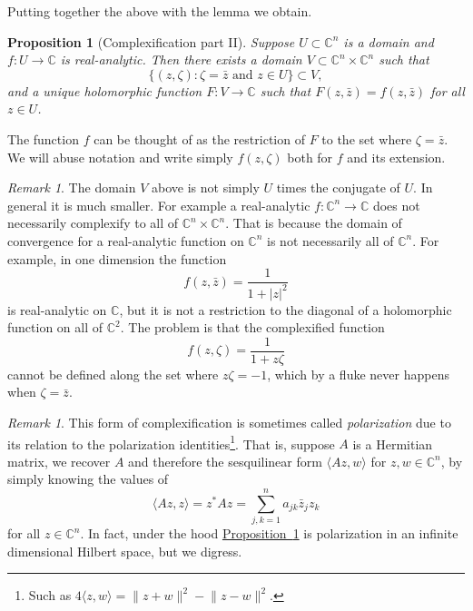 \documentclass[12pt,openany]{book}
\newcommand{\linnprod}[2]{\langle #1 , #2 \rangle}
\newcommand{\sabs}[1]{\lvert {#1} \rvert}
\newcommand{\snorm}[1]{\lVert {#1} \rVert}
\newcommand{\C}{{\mathbb{C}}}
\newcommand{\myindex}[1]{#1\index{#1}}
\theoremstyle{plain}
\newtheorem{prop}[thm]{Proposition}
\theoremstyle{remark}
\newtheorem{remark}[thm]{Remark}
\theoremstyle{definition}
\theoremstyle{exercise}
\theoremstyle{example}
\newcommand{\propref}[1]{\hyperref[#1]{Proposition~\ref*{#1}}}
\begin{document}
Putting together the above with the lemma we obtain.

\begin{prop}[Complexification part II] \label{prop:complexificationpt2}
Suppose $U \subset \C^n$ is a domain and $f \colon U \to \C$ is
real-analytic.
Then there exists a domain $V \subset \C^n \times \C^n$ such that
\begin{equation*}
\{ (z,\zeta) : \zeta = \bar{z} \text{ and } z \in U \} \subset V ,
\end{equation*}
and a unique holomorphic function $F \colon V \to \C$ such that
$F(z,\bar{z}) = f(z,\bar{z})$ for all $z \in U$.
\end{prop}

The function $f$ can be thought of as the restriction of $F$ to the set
where $\zeta = \bar{z}$.  We will abuse notation and write
simply $f(z,\zeta)$ both for $f$ and its extension.

\begin{remark}
The domain $V$ above is not simply $U$ times the conjugate of $U$.  In
general it is much smaller.  For example a real-analytic $f \colon \C^n \to
\C$ does not necessarily complexify to all of $\C^n \times \C^n$.  That is
because the domain of convergence for a real-analytic function on $\C^n$
is not necessarily all of $\C^n$.  For example, in one dimension
the function
\begin{equation*}
f(z,\bar{z})
= \frac{1}{1+\sabs{z}^2}
\end{equation*}
is real-analytic on $\C$, but it is not a restriction to the diagonal
of a holomorphic function on all of $\C^2$.  The problem is that the complexified
function
\begin{equation*}
f(z,\zeta)
= \frac{1}{1+z \zeta}
\end{equation*}
cannot be defined along the set where $z \zeta = -1$, which by a fluke
never happens when $\zeta = \bar{z}$.
\end{remark}

\begin{remark}
This form of complexification is sometimes called
\emph{\myindex{polarization}} due to its relation to the polarization
identities\footnote{Such as $4 \linnprod{z}{w} =
\snorm{z+w}^2-\snorm{z-w}^2$.}.  That is, suppose $A$ is a Hermitian matrix, we 
recover $A$ and therefore the sesquilinear form $\linnprod{Az}{w}$ for
$z,w\in \C^n$, by simply knowing the values of
\begin{equation*}
\linnprod{Az}{z} = z^*Az = \sum_{j,k=1}^n a_{jk} \bar{z}_j z_k 
\end{equation*}
for all $z \in \C^n$.  In fact, under the hood \propref{prop:complexificationpt2} is
polarization in an infinite
dimensional Hilbert space, but we digress.
\end{remark}
\end{document}
